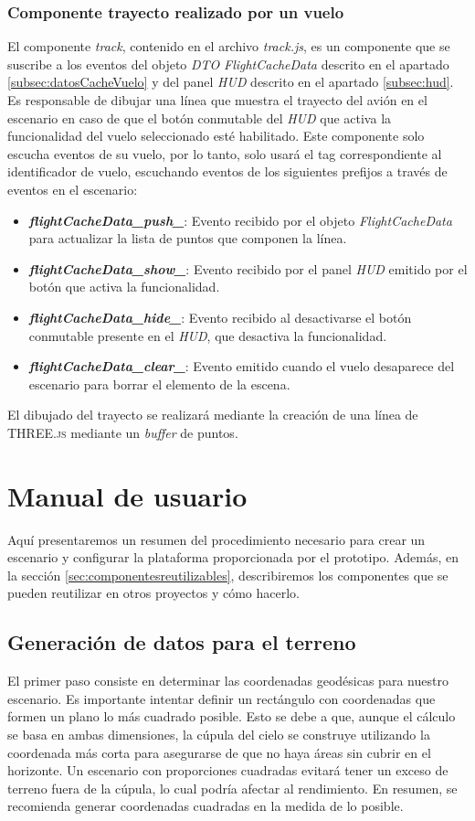\documentclass[a4paper, 11pt]{book}
\begin{document}
\subsection{Componente trayecto realizado por un vuelo}
\label{subsec:track}
El componente \emph{track}, contenido en el archivo \emph{track.js}, es un componente que se suscribe a los eventos del objeto \emph{DTO} \emph{FlightCacheData} descrito en el apartado \ref{subsec:datosCacheVuelo} y del panel \emph{HUD} descrito en el apartado \ref{subsec:hud}.
Es responsable de dibujar una línea que muestra el trayecto del avión en el escenario en caso de que el botón conmutable del \emph{HUD} que activa la funcionalidad del vuelo seleccionado esté habilitado. Este componente solo escucha eventos de su vuelo, por lo tanto, solo usará el tag correspondiente al identificador de vuelo, escuchando eventos de los siguientes prefijos a través de eventos en el escenario:
\begin{itemize}
	\item \textbf{\emph{flightCacheData\_push\_}}: Evento recibido por el objeto \emph{FlightCacheData} para actualizar la lista de puntos que componen la línea.
	\item \textbf{\emph{flightCacheData\_show\_}}: Evento recibido por el panel \emph{HUD} emitido por el botón que activa la funcionalidad.
	\item \textbf{\emph{flightCacheData\_hide\_}}: Evento recibido al desactivarse el botón conmutable presente en el \emph{HUD}, que desactiva la funcionalidad.
	\item \textbf{\emph{flightCacheData\_clear\_}}: Evento emitido cuando el vuelo desaparece del escenario para borrar el elemento de la escena.
\end{itemize}
El dibujado del trayecto se realizará mediante la creación de una línea de \textsc{THREE.js} mediante un \emph{buffer} de puntos.
\chapter{Manual de usuario}
Aquí presentaremos un resumen del procedimiento necesario para crear un escenario y configurar la plataforma proporcionada por el prototipo. Además, en la sección \ref{sec:componentesreutilizables}, describiremos los componentes que se pueden reutilizar en otros proyectos y cómo hacerlo.

\section{Generación de datos para el terreno}
El primer paso consiste en determinar las coordenadas geodésicas para nuestro escenario. Es importante intentar definir un rectángulo con coordenadas que formen un plano lo más cuadrado posible. Esto se debe a que, aunque el cálculo se basa en ambas dimensiones, la cúpula del cielo se construye utilizando la coordenada más corta para asegurarse de que no haya áreas sin cubrir en el horizonte. Un escenario con proporciones cuadradas evitará tener un exceso de terreno fuera de la cúpula, lo cual podría afectar al rendimiento. En resumen, se recomienda generar coordenadas cuadradas en la medida de lo posible.
\end{document}
